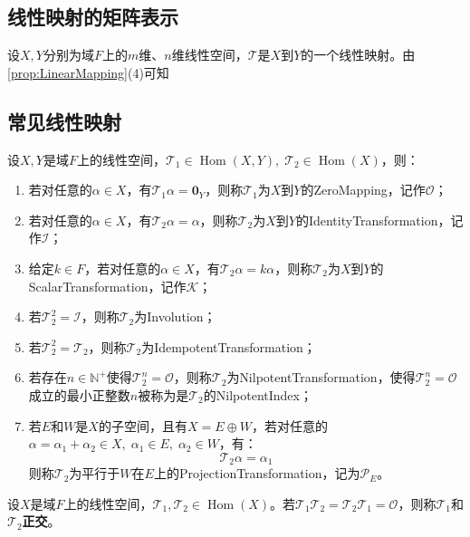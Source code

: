 \subsection{线性映射的矩阵表示}
\begin{definition}
	设$X,Y$分别为域$F$上的$m$维、$n$维线性空间，$\mathcal{T}$是$X$到$Y$的一个线性映射。由\cref{prop:LinearMapping}(4)可知
\end{definition}

\subsection{常见线性映射}
\begin{definition}
	设$X,Y$是域$F$上的线性空间，$\mathcal{T}_1\in\operatorname{Hom}(X,Y),\;\mathcal{T}_2\in\operatorname{Hom}(X)$，则：
	\begin{enumerate}
		\item 若对任意的$\alpha\in X$，有$\mathcal{T}_1\alpha=\mathbf{0}_Y$，则称$\mathcal{T}_1$为$X$到$Y$的\gls{ZeroMapping}，记作$\mathcal{O}$；
		\item 若对任意的$\alpha\in X$，有$\mathcal{T}_2\alpha=\alpha$，则称$\mathcal{T}_2$为$X$到$Y$的\gls{IdentityTransformation}，记作$\mathcal{I}$；
		\item 给定$k\in F$，若对任意的$\alpha\in X$，有$\mathcal{T}_2\alpha=k\alpha$，则称$\mathcal{T}_2$为$X$到$Y$的\gls{ScalarTransformation}，记作$\mathcal{K}$；
		\item 若$\mathcal{T}_2^2=\mathcal{I}$，则称$\mathcal{T}_2$为\gls{Involution}；
		\item 若$\mathcal{T}_2^2=\mathcal{T}_2$，则称$\mathcal{T}_2$为\gls{IdempotentTransformation}；
		\item 若存在$n\in\mathbb{N}^+$使得$\mathcal{T}_2^n=\mathcal{O}$，则称$\mathcal{T}_2$为\gls{NilpotentTransformation}，使得$\mathcal{T}_2^n=\mathcal{O}$成立的最小正整数$n$被称为是$\mathcal{T}_2$的\gls{NilpotentIndex}；
		\item 若$E$和$W$是$X$的子空间，且有$X=E\oplus W$，若对任意的$\alpha=\alpha_1+\alpha_2\in X,\;\alpha_1\in E,\;\alpha_2\in W$，有：
		\begin{equation*}
			\mathcal{T}_2\alpha=\alpha_1
		\end{equation*}
		则称$\mathcal{T}_2$为平行于$W$在$E$上的\gls{ProjectionTransformation}，记为$\mathcal{P}_E$。
	\end{enumerate}
\end{definition}
\begin{definition}
	设$X$是域$F$上的线性空间，$\mathcal{T}_1,\mathcal{T}_2\in \operatorname{Hom}(X)$。若$\mathcal{T}_1\mathcal{T}_2=\mathcal{T}_2\mathcal{T}_1=\mathcal{O}$，则称$\mathcal{T}_1$和$\mathcal{T}_2$\textbf{正交}。
\end{definition}

